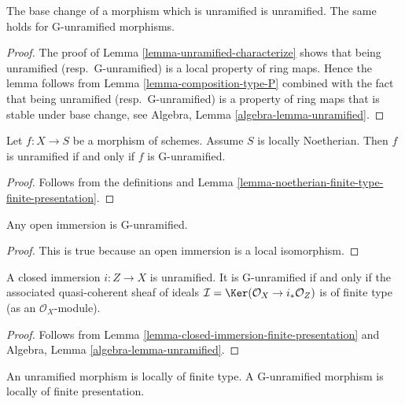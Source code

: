 \begin{lemma}
\label{lemma-base-change-unramified}
The base change of a morphism which is unramified is unramified.
The same holds for G-unramified morphisms.
\end{lemma}

\begin{proof}
The proof of Lemma \ref{lemma-unramified-characterize}
shows that being unramified (resp.\ G-unramified)
is a local property of ring maps. Hence the lemma follows from
Lemma \ref{lemma-composition-type-P} combined
with the fact that being unramified (resp.\ G-unramified)
is a property of ring maps that is stable under base change, see
Algebra, Lemma \ref{algebra-lemma-unramified}.
\end{proof}

\begin{lemma}
\label{lemma-noetherian-unramified}
Let $f : X \to S$ be a morphism of schemes. Assume $S$ is locally Noetherian.
Then $f$ is unramified if and only if $f$ is G-unramified.
\end{lemma}

\begin{proof}
Follows from the definitions and
Lemma \ref{lemma-noetherian-finite-type-finite-presentation}.
\end{proof}


\begin{lemma}
\label{lemma-open-immersion-unramified}
Any open immersion is G-unramified.
\end{lemma}

\begin{proof}
This is true because an open immersion is a local isomorphism.
\end{proof}

\begin{lemma}
\label{lemma-closed-immersion-unramified}
A closed immersion $i : Z \to X$ is unramified.
It is G-unramified if and only if the associated quasi-coherent sheaf of
ideals $\mathcal{I} = \Ker(\mathcal{O}_X \to i_*\mathcal{O}_Z)$
is of finite type (as an $\mathcal{O}_X$-module).
\end{lemma}

\begin{proof}
Follows from Lemma \ref{lemma-closed-immersion-finite-presentation} and
Algebra, Lemma \ref{algebra-lemma-unramified}.
\end{proof}

\begin{lemma}
\label{lemma-unramified-locally-finite-type}
An unramified morphism is locally of finite type.
A G-unramified morphism is locally of finite presentation.
\end{lemma}


